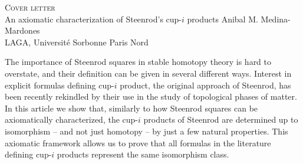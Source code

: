 \documentclass{amsart}
\begin{document}
	\begin{center}
		\Huge{\textsc{Cover letter}} \\
		\vskip10pt
		\Large{An axiomatic characterization of Steenrod's cup-$i$ products}
		\vskip10pt
		\normalsize{Anibal M. Medina-Mardones \\
		LAGA, Universit\'e Sorbonne Paris Nord}
		\vskip10pt
	\end{center}

	The importance of Steenrod squares in stable homotopy theory is hard to overstate, and their definition can be given in several different ways.
	Interest in explicit formulas defining cup-$i$ product, the original approach of Steenrod, has been recently rekindled by their use in the study of topological phases of matter.
	In this article we show that, similarly to how Steenrod squares can be axiomatically characterized, the cup-$i$ products of Steenrod are determined up to isomorphism -- and not just homotopy -- by just a few natural properties.
	This axiomatic framework allows us to prove that all formulas in the literature defining cup-$i$ products represent the same isomorphism class.
\end{document}

